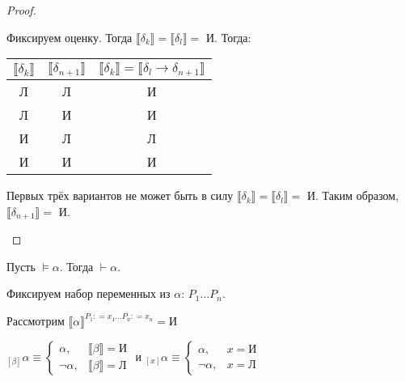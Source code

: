 \documentclass[12pt, a4paper, oneside]{book}
\begin{document}
\begin{proof}
\begin{enumerate}
              Фиксируем оценку. Тогда \(\llbracket \delta_k \rrbracket = \llbracket \delta_l \rrbracket =\) И. Тогда:

              \begin{center}
                  \begin{tabular}{c|c|c}
                      \(\llbracket \delta_k \rrbracket\) & \(\llbracket \delta_{n + 1} \rrbracket \) & \(\llbracket \delta_k \rrbracket = \llbracket \delta_l \to \delta_{n + 1} \rrbracket\) \\ \hline
                      Л                                  & Л                                         & И                                                                                      \\
                      Л                                  & И                                         & И                                                                                      \\
                      И                                  & Л                                         & Л                                                                                      \\
                      И                                  & И                                         & И                                                                                      \\
                  \end{tabular}
              \end{center}

              Первых трёх вариантов не может быть в силу \(\llbracket \delta_k \rrbracket = \llbracket \delta_l \rrbracket =\) И. Таким образом, \(\llbracket \delta_{n + 1} \rrbracket = \) И.
    \end{enumerate}
\end{proof}

\begin{theorem}[о полноте]
    Пусть \(\models \alpha\). Тогда \(\vdash \alpha\).
\end{theorem}

Фиксируем набор переменных из \(\alpha\): \(P_1 \dots P_n\).

Рассмотрим \(\llbracket \alpha \rrbracket^{P_1 : = x_1 \dots P_n: = x_n} = \text{И}\)

\begin{obozn}
    \({}_{[\beta]} \alpha \equiv \begin{cases}
        \alpha,      & \llbracket \beta \rrbracket = \text{И} \\
        \neg \alpha, & \llbracket \beta \rrbracket = \text{Л}
    \end{cases}\) и \({}_{[x]} \alpha \equiv \begin{cases}
        \alpha,      & x = \text{И} \\
        \neg \alpha, & x = \text{Л}
    \end{cases}\)
\end{obozn}
\end{document}
